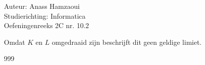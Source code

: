 \documentclass[a4paper]{article}
\begin{document}
  
\noindent \large Auteur: Anass Hamzaoui \\
\noindent \large Studierichting: Informatica\\
\noindent \large Oefeningenreeks 2C nr. 10.2\\
\medskip
\normalsize


Omdat $K$ en $L$ omgedraaid zijn beschrijft dit geen geldige limiet.


\begin{thebibliography}{999}
\end{thebibliography}
\end{document}
